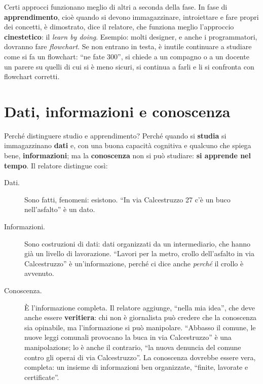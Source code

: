 Certi approcci funzionano meglio di altri a seconda della fase. In fase di
\textbf{apprendimento}, cioè quando si devono immagazzinare, introiettare e
fare propri dei concetti, è dimostrato, dice il relatore, che funziona
meglio l'approccio \textbf{cinestetico}: il \emph{learn by doing}. Esempio:
molti designer, e anche i programmatori, dovranno fare \emph{flowchart}. Se
non entrano in testa, è inutile continuare a studiare come si fa un
flowchart: ``ne fate 300'', si chiede a un compagno o a un docente un parere
su quelli di cui si è meno sicuri, si continua a farli e li si confronta con
flowchart corretti.

\section{Dati, informazioni e conoscenza}
\label{p0:sec:dati}

Perché distinguere studio e apprendimento? Perché quando si \textbf{studia}
si immagazzinano \textbf{dati} e, con una buona capacità cognitiva e
qualcuno che spiega bene, \textbf{informazioni}; ma la \textbf{conoscenza}
non si può studiare: \textbf{si apprende nel tempo}. Il relatore distingue
così:
\begin{description}
  \item[Dati.] Sono fatti, fenomeni: esistono. ``In via Calcestruzzo 27 c'è
        un buco nell'asfalto'' è un dato.
  \item[Informazioni.] Sono costruzioni di dati: dati organizzati da un
        intermediario, che hanno già un livello di lavorazione. ``Lavori
        per la metro, crollo dell'asfalto in via Calcestruzzo'' è
        un'informazione, perché ci dice anche \emph{perché} il crollo è
        avvenuto.
  \item[Conoscenza.] È l'informazione completa. Il relatore aggiunge,
        ``nella mia idea'', che deve anche essere \textbf{veritiera}: chi non
        è giornalista può credere che la conoscenza sia opinabile, ma
        l'informazione si può manipolare. ``Abbasso il comune, le nuove
        leggi comunali provocano la buca in via Calcestruzzo'' è una
        manipolazione; lo è anche il contrario, ``la nuova denuncia del
        comune contro gli operai di via Calcestruzzo''. La conoscenza
        dovrebbe essere vera, completa: un insieme di informazioni ben
        organizzate, ``finite, lavorate e certificate''.
\end{description}

